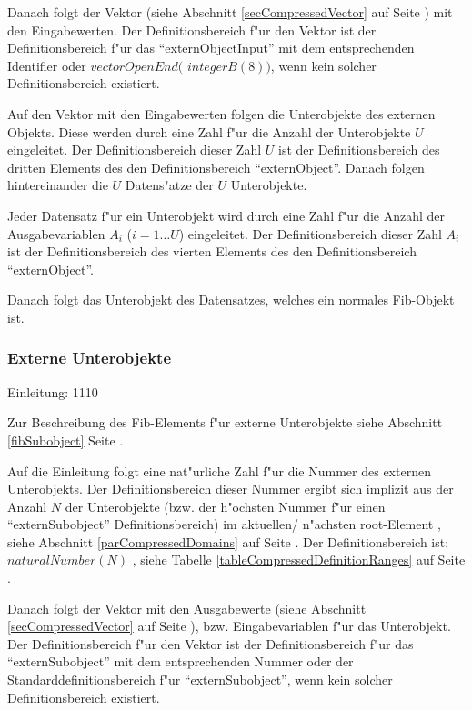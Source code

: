 Danach folgt der Vektor (siehe Abschnitt \ref{secCompressedVector} auf Seite \pageref{secCompressedVector}) mit den Eingabewerten. Der Definitionsbereich f"ur den Vektor ist der Definitionsbereich f"ur das ``externObjectInput'' mit dem entsprechenden Identifier oder $vectorOpenEnd($ $integerB(8) )$, wenn kein solcher Definitionsbereich existiert.

Auf den Vektor mit den Eingabewerten folgen die Unterobjekte des externen Objekts. Diese werden durch eine Zahl f"ur die Anzahl der Unterobjekte $U$ eingeleitet. Der Definitionsbereich dieser Zahl $U$ ist der Definitionsbereich des dritten Elements des den Definitionsbereich ``externObject''. Danach folgen hintereinander die $U$ Datens"atze der $U$ Unterobjekte.

Jeder Datensatz f"ur ein Unterobjekt wird durch eine Zahl f"ur die Anzahl der Ausgabevariablen $A_i$ ($i=1 \ldots U$) eingeleitet. Der Definitionsbereich dieser Zahl $A_i$ ist der Definitionsbereich des vierten Elements des den Definitionsbereich ``externObject''.

Danach folgt das Unterobjekt des Datensatzes, welches ein normales Fib-Objekt ist.



\subsubsection{Externe Unterobjekte}
\label{secCompressedExternSubobjects}

Einleitung: 1110

\bigskip\noindent
Zur Beschreibung des Fib-Elements f"ur externe Unterobjekte siehe Abschnitt \ref{fibSubobject} Seite \pageref{fibSubobject} .

Auf die Einleitung folgt eine nat"urliche Zahl f"ur die Nummer des externen Unterobjekts. Der Definitionsbereich dieser Nummer ergibt sich implizit aus der Anzahl $N$ der Unterobjekte (bzw. der h"ochsten Nummer f"ur einen ``externSubobject'' Definitionsbereich) im aktuellen/ n"achsten root-Element , siehe Abschnitt \ref{parCompressedDomains} auf Seite \pageref{parCompressedDomains} . Der Definitionsbereich ist: $naturalNumber(N)$ , siehe Tabelle \ref{tableCompressedDefinitionRanges} auf Seite \pageref{tableCompressedDefinitionRanges} .

Danach folgt der Vektor mit den Ausgabewerte (siehe Abschnitt \ref{secCompressedVector} auf Seite \pageref{secCompressedVector}), bzw. Eingabevariablen f"ur das Unterobjekt. Der Definitionsbereich f"ur den Vektor ist der Definitionsbereich f"ur das ``externSubobject'' mit dem entsprechenden Nummer oder der Standarddefinitionsbereich f"ur ``externSubobject'', wenn kein solcher Definitionsbereich existiert.

